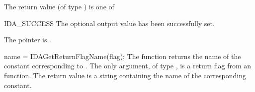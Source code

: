 {{  The return value  (of type ) is one of
  \begin{args}
  \item[IDA\_SUCCESS] 
    The optional output value has been successfully set.
  \item[\Id{IDA\_MEM\_NULL}]
    The  pointer is .
  \end{args}
}
{}
{
  name = IDAGetReturnFlagName(flag);
}
{
  The function  returns the
  name of the {\idas} constant corresponding to .
}
{
  The only argument, of type , is a return flag from an {\idas} function.
}
{
  The return value is a string containing the name of the corresponding constant.
}
{}
}
